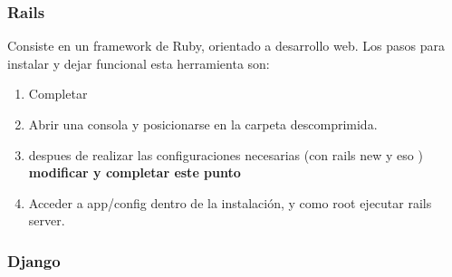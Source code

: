 \subsubsection{Rails}

Consiste en un framework de Ruby, orientado a desarrollo web. Los pasos para instalar y dejar funcional esta herramienta son:

\begin{enumerate}
 \item Completar
 \item Abrir una consola  y posicionarse en la carpeta descomprimida.
 \item despues de realizar las configuraciones necesarias (con rails new y eso ) \textbf{modificar y completar este punto}
 \item Acceder a app/config dentro de la instalación, y como root ejecutar rails server.
\end{enumerate}


\subsubsection{Django}

